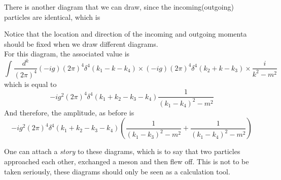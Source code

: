 \documentclass[11pt, notitlepage]{report}
\numberwithin{equation}{section}
\begin{document}
    There is another diagram that we can draw, since the incoming(outgoing) particles are identical, which is 
    \begin{figure}[h]
        \centering
    \end{figure}

    Notice that the location and direction of the incoming and outgoing momenta should be fixed when we draw different diagrams.\\
    For this diagram, the associated value is 
    \begin{equation*}
        \int \frac{d^k}{(2\pi)^4}(-ig)(2\pi)^4\delta^4(k_1 - k - k_4)\times(-ig)(2\pi)^4\delta^4(k_2 + k - k_3)\times \frac{i}{k^2 - m^2 } 
    \end{equation*}
    which is equal to 
    \begin{equation*}
        -ig^2 (2\pi)^4\delta^4(k_1 +k_2 - k_3 - k_4) \frac{1}{(k_1 - k_4)^2 - m^2}
    \end{equation*}
    And therefore, the amplitude, as before is 
    \begin{equation*}
        -ig^2 (2\pi)^4\delta^4(k_1 +k_2 - k_3 - k_4) \left( \frac{1}{(k_1 - k_3)^2 - m^2 } + \frac{1}{(k_1 - k_4)^2 - m^2 } \right)
    \end{equation*}

    One can attach a \textit{story} to these diagrams, which is to say that two particles approached each other, exchanged a meson and then flew off. This is not to be taken seriously, these diagrams should only be seen as a calculation tool.\\
\end{document}
